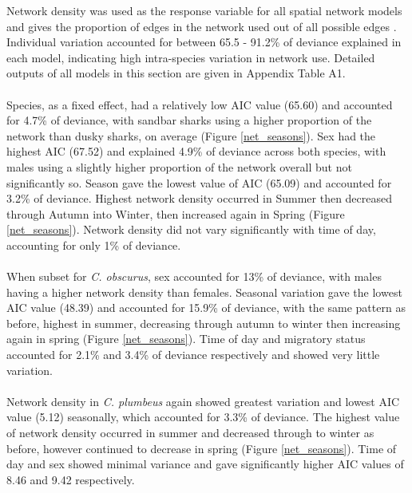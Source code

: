 \documentclass[11pt,a4paper]{article}
\begin{document}
	Network density was used as the response variable for all spatial network models and gives the proportion of edges in the network used out of all possible edges \citep{Mourier2018}. Individual variation accounted for between 65.5 - 91.2\% of deviance explained in each model, indicating high intra-species variation in network use. Detailed outputs of all models in this section are given in Appendix Table A1.\\
	\\	
	Species, as a fixed effect, had a relatively low AIC value (65.60) and accounted for 4.7\% of deviance, with sandbar sharks using a higher proportion of the network than dusky sharks, on average (Figure \ref{net_seasons}). Sex had the highest AIC (67.52) and explained 4.9\% of deviance across both species, with males using a slightly higher proportion of the network overall but not significantly so. Season gave the lowest value of AIC (65.09) and accounted for 3.2\% of deviance. Highest network density occurred in Summer then decreased through Autumn into Winter, then increased again in Spring (Figure \ref{net_seasons}). Network density did not vary significantly with time of day, accounting for only 1\% of deviance.\\
	\\
	When subset for \textit{C. obscurus}, sex accounted for 13\% of deviance, with males having a higher network density than females. Seasonal variation gave the lowest AIC value (48.39) and accounted for 15.9\% of deviance, with the same pattern as before, highest in summer, decreasing through autumn to winter then increasing again in spring (Figure \ref{net_seasons}). Time of day and migratory status accounted for 2.1\% and 3.4\% of deviance respectively and showed very little variation.\\
	\\
	Network density in \textit{C. plumbeus} again showed greatest variation and lowest AIC value (5.12) seasonally, which accounted for 3.3\% of deviance. The highest value of network density occurred in summer and decreased through to winter as before, however continued to decrease in spring (Figure \ref{net_seasons}). Time of day and sex showed minimal variance and gave significantly higher AIC values of 8.46 and 9.42 respectively.
	
\end{document}
